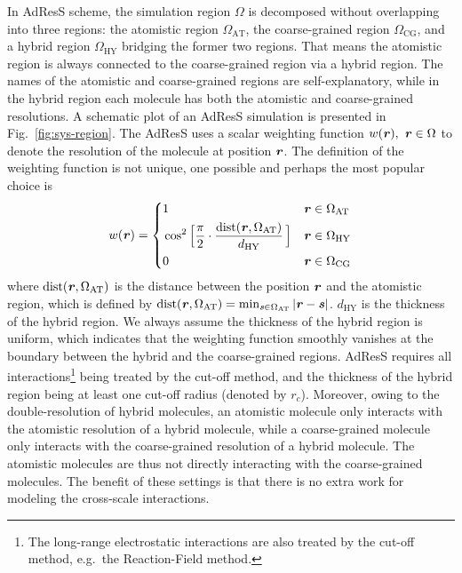 \documentclass[epjST]{svjour}
\newcommand{\vect}[1]{\textbf{\textit{#1}}}
\newcommand{\dist}[0]{\textrm {dist}}
\newcommand{\AT}[0]{\textrm{AT}}
\newcommand{\HY}[0]{\textrm{HY}}
\newcommand{\CG}[0]{\textrm{CG}}
\begin{document}
In AdResS scheme, the simulation region $\Omega$ is 
decomposed without overlapping into three regions:
the atomistic region $\Omega_\AT$, the coarse-grained region $\Omega_\CG$, and
a hybrid region $\Omega_\HY$ bridging the former two regions.
That means the atomistic region is always connected to the coarse-grained region via a hybrid region.
The names of the atomistic and coarse-grained regions are self-explanatory, while
in the hybrid region each molecule has both the atomistic and coarse-grained resolutions.
A schematic plot of an AdResS simulation is presented in Fig.~\ref{fig:sys-region}.
The AdResS uses a scalar weighting function $w(\vect r),\ \vect r\in\Omega$ 
to denote the resolution of the molecule at position $\vect r$.
The definition of the weighting function
is not unique, one possible and perhaps the most popular choice is
\begin{equation}\label{eqn:old-w}
  w(\vect r) =
  \left\{
    \begin{alignedat}{3}
      &1 &\quad& \vect r \in \Omega_\AT\\
      &\cos^2\Big[\frac{\pi}{2 } \cdot \frac{\dist(\vect r, \Omega_\AT)}{d_\HY}\,\Big] && \vect r \in\Omega_\HY \\
      &0 &    & \vect r \in \Omega_\CG 
    \end{alignedat}
  \right.
\end{equation}
where $\dist(\vect r, \Omega_\AT)$ is the distance between the
position $\vect r$ and the atomistic region, which is defined
by $\dist(\vect r, \Omega_\AT) = \min_{\vect s\in\Omega_\AT} \vert
\vect r - \vect s \vert$.  $d_\HY$ is the thickness of the hybrid
region. We always assume the thickness of the hybrid region is
uniform, which indicates that the weighting function smoothly vanishes
at the boundary between the hybrid and the coarse-grained regions.
AdResS requires 
all interactions\footnote{The long-range electrostatic interactions
  are also treated by the cut-off method, e.g.~the Reaction-Field method.
} being treated
by the cut-off method, and the thickness of
the hybrid region being at least one cut-off radius (denoted by $r_c$).
Moreover, owing to the double-resolution of hybrid molecules,
an atomistic molecule only interacts with the 
atomistic resolution of a hybrid molecule,
while a coarse-grained molecule only interacts with the coarse-grained resolution
of a hybrid molecule.
The atomistic molecules are thus not directly interacting with the coarse-grained molecules.
The benefit of these settings is that
there is no extra work for modeling the cross-scale interactions.
\end{document}
